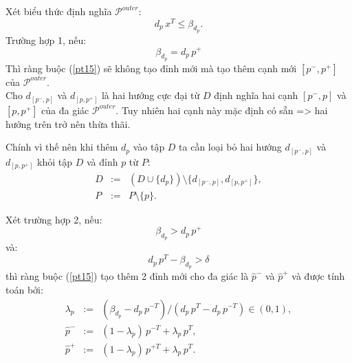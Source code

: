 \documentclass[11pt]{beamer}
\theoremstyle{definition}
\theoremstyle{plain}
\theoremstyle{plain}
\theoremstyle{remark}
\begin{document}
	
	\begin{frame}
		Xét biểu thức định nghĩa $\mathcal{P}^{outer}$:
		\begin{equation}\label{pt15}
			d_p\, x^T \leq \beta_{d_p}.
		\end{equation}
		Trường hợp 1, nếu:
		\begin{equation}
			\label{betaequal}
			\beta_{d_p} = d_p\, p^+
		\end{equation}
		Thì ràng buộc (\ref{pt15}) sẽ không tạo đỉnh mới mà tạo thêm cạnh mới $[p^-, p^+]$ của $\mathcal{P}^{outer}$.\\
		Cho $d_{[p^-, p]}$ và $d_{[p, p^+]}$ là hai hướng cực đại từ $D$ định nghĩa hai cạnh $[p^-, p]$ và $[p, p^+]$ của đa giác $\mathcal{P}^{outer}$. Tuy nhiên hai cạnh này mặc định có sẵn => hai hướng trên trở nên thừa thãi. 
		
	\end{frame}
	
	\begin{frame}
		Chính vì thế nên khi thêm $d_p$ vào tập $D$ ta cần loại bỏ hai hướng $d_{[p^-, p]}$ và $d_{[p, p^+]}$ khỏi tập $D$ và đỉnh $p$ từ $P$:
		\begin{equation}\label{newDP2}
			\begin{array}{lcl}
				D &:=& (D \cup \{d_{p}\})\setminus \{d_{[p^-,p]}, d_{[p,p^+]}\}, \\
				P &:=& P \setminus \{p\}.
			\end{array}
		\end{equation}
	\end{frame}
	
	\begin{frame}
		Xét trường hợp 2, nếu:
		\begin{equation}\label{betagreater}
			\beta_{d_p} > d_p\, p^+
		\end{equation}
		và:
		\begin{equation}\label{greaterdelta}
			d_{p}\, p^T - \beta_{d_{p}} > \delta
		\end{equation}
		thì ràng buộc (\ref{pt15}) tạo thêm 2 đỉnh mới cho đa giác là $\hat p^-$ và $\hat p^+$ và được tính toán bởi:
		\begin{equation}\label{def_hatp}
			\begin{array}{lcl}
				\lambda_p &:=& (\beta_{d_p} - d_p\, p^{-T})/(d_p\, p^T - d_p\, p^{-T}) \in (0, 1), \\
				\hat p^- &:=& (1 - \lambda_p)\, p^{-T} + \lambda_p\, p^T, \\
				\hat p^+ &:=& (1 - \lambda_p)\, p^{+T} + \lambda_p\, p^T.
			\end{array}
		\end{equation}
	\end{frame}
	
\end{document}

